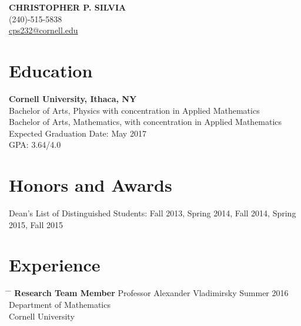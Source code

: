\documentclass[12pt]{res}
\begin{document}
\begin{centering}
{\bf CHRISTOPHER P. SILVIA}\\
(240)-515-5838\\
\href{mailto:cps232@cornell.edu}{cps232@cornell.edu}\\
\end{centering}

\vspace{30pt}

\address{\bf Present Address \\608 East Buffalo St.\\Ithaca, NY 14850}
\address{\bf Permanant Address \\ 7801 Leesburg Drive \\ Bethesda MD, 20817}


\begin{resume}
  \section{Education}

	\noindent
    {\bf Cornell University, Ithaca, NY}\\
    Bachelor of Arts, Physics with concentration in Applied Mathematics\\
    Bachelor of Arts, Mathematics, with concentration in Applied Mathematics\\
    Expected Graduation Date: May 2017 \\
    GPA: 3.64/4.0

  \section{Honors and Awards}
	\noindent
    Dean's List of Distinguished Students: Fall 2013, Spring 2014, Fall 2014, Spring 2015, Fall 2015\\

  \vspace{-10pt}
  \section{Experience}
    
    \vspace{5pt}
    \begin{tabbing}
      \hspace{2.3in} \= \hspace{2.6in} \= \kill
      {\bf Research Team Member} \> Professor Alexander Vladimirsky  \> Summer 2016 \\
		\> Department of Mathematics\\
		\> Cornell University \\
    \end{tabbing}\vspace{-30pt}	


\end{resume}
\end{document}
